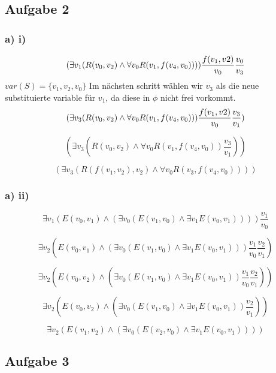 \documentclass[12pt]{article}
\begin{document}
\subsection*{Aufgabe 2}
\subsubsection*{a) i)}
\begin{equation}
  (\exists v_1(R(v_0, v_2)\land \forall v_0 R(v_1, f(v_4, v_0))))\frac{f(v_1,v2)}{v_0}\frac{v_0}{v_3} \\
\end{equation}
$var(S)=\{v_1, v_2, v_0\}$
Im nächsten schritt wählen wir $v_3$ als die neue substituierte variable für $v_1$, da diese in $\phi$ nicht frei vorkommt.
\begin{equation}
  (\exists v_3(R(v_0, v_2)\land \forall v_0 R(v_1, f(v_4, v_0)))\frac{f(v_1,v2)}{v_0}\frac{v_3}{v_1}) \\
\end{equation}

\begin{equation}
  (\exists v_3(R(v_0, v_2)\land \forall v_0 R(v_1, f(v_4, v_0))\frac{v_3}{v_1}))
\end{equation}

\begin{equation}
  (\exists v_3(R(f(v_1,v_2), v_2)\land \forall v_0 R(v_3, f(v_4, v_0))))
\end{equation}

\subsubsection*{a) ii)}
\begin{equation}
  \exists v_1 (E(v_0, v_1) \land (\exists v_0(E(v_1, v_0)\land \exists v_1 E(v_0, v_1))))\frac{v_1}{v_0}
\end{equation}


\begin{equation}
  \exists v_2 (E(v_0, v_1) \land (\exists v_0(E(v_1, v_0)\land \exists v_1 E(v_0, v_1)))\frac{v_1}{v_0}\frac{v_2}{v_1})
\end{equation}


\begin{equation}
  \exists v_2 (E(v_0, v_2) \land (\exists v_0(E(v_1, v_0)\land \exists v_1 E(v_0, v_1))\frac{v_1}{v_0}\frac{v_2}{v_1}))
\end{equation}


\begin{equation}
  \exists v_2 (E(v_0, v_2) \land (\exists v_0(E(v_1, v_0)\land \exists v_1 E(v_0, v_1))\frac{v_2}{v_1}))
\end{equation}


\begin{equation}
  \exists v_2 (E(v_1, v_2) \land (\exists v_0(E(v_2, v_0)\land \exists v_1 E(v_0, v_1))))
\end{equation}

\subsection*{Aufgabe 3}
\end{document}
